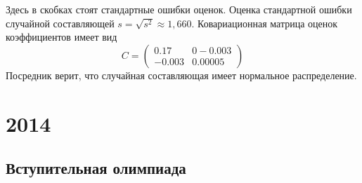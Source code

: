 \documentclass[addpoints, answers]{exam} %
\begin{document}
\begin{questions}
\begin{parts}
Здесь в скобках стоят стандартные ошибки оценок. Оценка стандартной ошибки
случайной составляющей $s=\sqrt{s^2}\approx 1,660$. Ковариационная матрица оценок
коэффициентов имеет вид 
\[
C=\left(
\begin{array}{cc}
0.17 & 0 -0.003 \\
-0.003 & 0.00005
\end{array}
\right)
\]
Посредник верит, что случайная составляющая имеет нормальное распределение.
\end{parts}

\end{questions}

\section{2014}

\subsection{Вступительная олимпиада}
\end{document}
